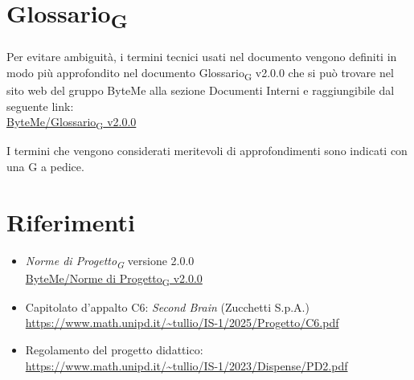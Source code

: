 \documentclass[11pt,a4paper]{article}
\newcommand{\gls}[1]{#1\textsubscript{G}}
\begin{document}
\section{\gls{Glossario}}
Per evitare ambiguità, i termini tecnici usati nel documento vengono definiti in modo più approfondito nel documento \gls{Glossario} v2.0.0 che si può trovare nel sito web del gruppo ByteMe alla sezione Documenti Interni e raggiungibile dal seguente link:\\
\href{https://byteme25.github.io/ByteMe/files.html}{ByteMe/\gls{Glossario} v2.0.0}

I termini che vengono considerati meritevoli di approfondimenti sono indicati con una G a pedice.


\section{Riferimenti}
\begin{itemize}
  \item \textit{\gls{Norme di Progetto}} versione 2.0.0\\
  \href{https://byteme25.github.io/ByteMe/files.html}{ByteMe/\gls{Norme di Progetto} v2.0.0}
  \item Capitolato d'appalto C6: \textit{Second Brain} (Zucchetti S.p.A.)\\ \url{https://www.math.unipd.it/~tullio/IS-1/2025/Progetto/C6.pdf}
  \item Regolamento del progetto didattico:\\
        \url{https://www.math.unipd.it/~tullio/IS-1/2023/Dispense/PD2.pdf}
\end{itemize}
 
\end{document}

